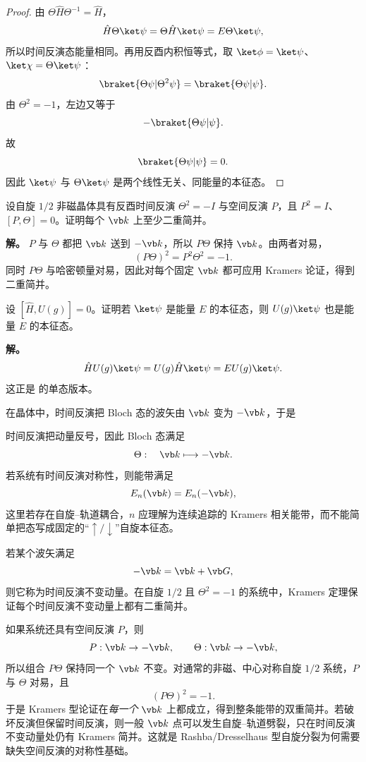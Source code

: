 \begin{proof}
由 $\Theta\hat H\Theta^{-1}=\hat H$，
\[
\hat H\Theta\ket\psi
=\Theta\hat H\ket\psi
=E\Theta\ket\psi,
\]
所以时间反演态能量相同。再用反酉内积恒等式，取 $\ket\phi=\ket\psi$、$\ket\chi=\Theta\ket\psi$：
\[
\braket{\Theta\psi|\Theta^2\psi}
=\braket{\Theta\psi|\psi}.
\]
由 $\Theta^2=-1$，左边又等于
\[
-\braket{\Theta\psi|\psi}.
\]
故
\[
\braket{\Theta\psi|\psi}=0.
\]
因此 $\ket\psi$ 与 $\Theta\ket\psi$ 是两个线性无关、同能量的本征态。
\end{proof}

\begin{workedexample}
设自旋 $1/2$ 非磁晶体具有反酉时间反演 $\Theta^2=-I$ 与空间反演 $P$，且 $P^2=I$、$[P,\Theta]=0$。证明每个 $\vb k$ 上至少二重简并。

\textbf{解。} $P$ 与 $\Theta$ 都把 $\vb k$ 送到 $-\vb k$，所以 $P\Theta$ 保持 $\vb k$。由两者对易，
\[
(P\Theta)^2=P^2\Theta^2=-1.
\]
同时 $P\Theta$ 与哈密顿量对易，因此对每个固定 $\vb k$ 都可应用 Kramers 论证，得到二重简并。
\end{workedexample}

\begin{workedexample}
设 $[\hat H,U(g)]=0$。证明若 $\ket\psi$ 是能量 $E$ 的本征态，则 $U(g)\ket\psi$ 也是能量 $E$ 的本征态。

\textbf{解。}
\[
\hat H U(g)\ket\psi
=U(g)\hat H\ket\psi
=E U(g)\ket\psi.
\]
这正是  的单态版本。
\end{workedexample}


在晶体中，时间反演把 Bloch 态的波矢由 $\vb k$ 变为 $-\vb k$，于是

时间反演把动量反号，因此 Bloch 态满足
\[
\Theta:\quad \vb k\longmapsto-\vb k.
\]
若系统有时间反演对称性，则能带满足
\[
E_n(\vb k)=E_n(-\vb k),
\label{eq:tr-band-symmetry}
\]
这里若存在自旋--轨道耦合，$n$ 应理解为连续追踪的 Kramers 相关能带，而不能简单把态写成固定的“$\uparrow/\downarrow$”自旋本征态。

若某个波矢满足
\[
-\vb k=\vb k+\vb G,
\]
则它称为时间反演不变动量。在自旋 $1/2$ 且 $\Theta^2=-1$ 的系统中，Kramers 定理保证每个时间反演不变动量上都有二重简并。

如果系统还具有空间反演 $P$，则
\[
P:\vb k\to-\vb k,
\qquad
\Theta:\vb k\to-\vb k,
\]
所以组合 $P\Theta$ 保持同一个 $\vb k$ 不变。对通常的非磁、中心对称自旋 $1/2$ 系统，$P$ 与 $\Theta$ 对易，且
\[
(P\Theta)^2=-1.
\]
于是 Kramers 型论证在\emph{每一个} $\vb k$ 上都成立，得到整条能带的双重简并。若破坏反演但保留时间反演，则一般 $\vb k$ 点可以发生自旋--轨道劈裂，只在时间反演不变动量处仍有 Kramers 简并。这就是 Rashba/Dresselhaus 型自旋分裂为何需要缺失空间反演的对称性基础。

